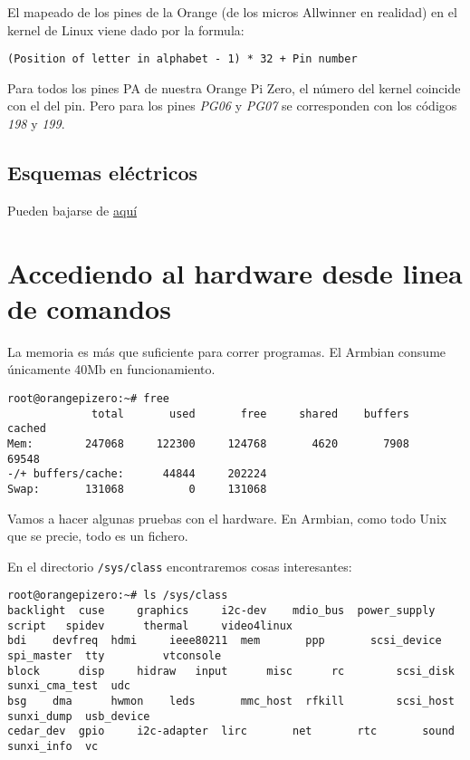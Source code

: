\documentclass[12pt,spanish,]{scrartcl}
\begin{document}
El mapeado de los pines de la Orange (de los micros Allwinner en
realidad) en el kernel de Linux viene dado por la formula:

\begin{verbatim}
(Position of letter in alphabet - 1) * 32 + Pin number
\end{verbatim}

Para todos los pines PA de nuestra Orange Pi Zero, el número del kernel
coincide con el del pin. Pero para los pines \emph{PG06} y \emph{PG07}
se corresponden con los códigos \emph{198} y \emph{199}.

\hypertarget{esquemas-eluxe9ctricos}{%
\subsection{Esquemas eléctricos}\label{esquemas-eluxe9ctricos}}

Pueden bajarse de
\href{http://harald.studiokubota.com/wordpress/wp-content/uploads/2016/11/Orange-Pi-Zero-Schanetics-v1_11.pdf}{aquí}

\hypertarget{accediendo-al-hardware-desde-linea-de-comandos}{%
\section{Accediendo al hardware desde linea de
comandos}\label{accediendo-al-hardware-desde-linea-de-comandos}}

La memoria es más que suficiente para correr programas. El Armbian
consume únicamente 40Mb en funcionamiento.

\begin{verbatim}
root@orangepizero:~# free
             total       used       free     shared    buffers     cached
Mem:        247068     122300     124768       4620       7908      69548
-/+ buffers/cache:      44844     202224
Swap:       131068          0     131068
\end{verbatim}

Vamos a hacer algunas pruebas con el hardware. En Armbian, como todo
Unix que se precie, todo es un fichero.

En el directorio \texttt{/sys/class} encontraremos cosas interesantes:

\begin{verbatim}
root@orangepizero:~# ls /sys/class
backlight  cuse     graphics     i2c-dev    mdio_bus  power_supply  script   spidev      thermal     video4linux
bdi    devfreq  hdmi     ieee80211  mem       ppp       scsi_device  spi_master  tty         vtconsole
block      disp     hidraw   input      misc      rc        scsi_disk    sunxi_cma_test  udc
bsg    dma      hwmon    leds       mmc_host  rfkill        scsi_host    sunxi_dump  usb_device
cedar_dev  gpio     i2c-adapter  lirc       net       rtc       sound    sunxi_info  vc
\end{verbatim}
\end{document}
